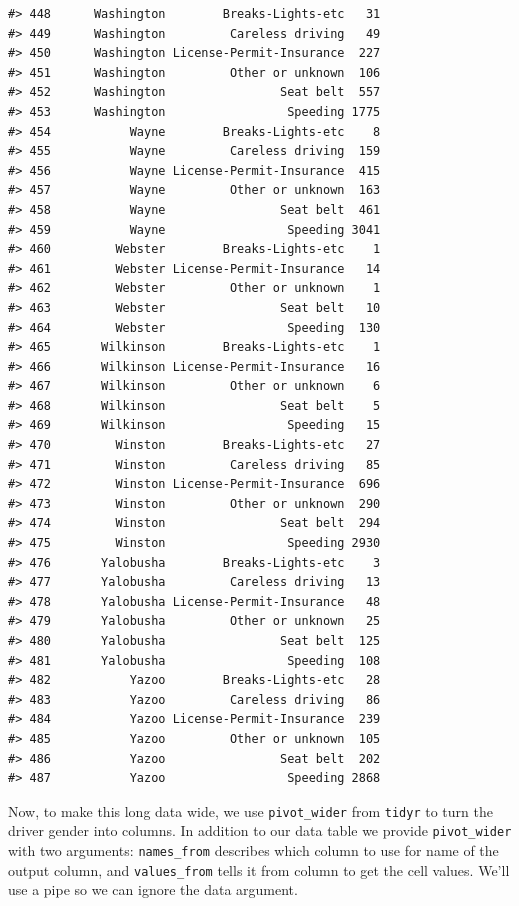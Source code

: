 \documentclass[
]{book}
\begin{document}
\begin{verbatim}
#> 448      Washington        Breaks-Lights-etc   31
#> 449      Washington         Careless driving   49
#> 450      Washington License-Permit-Insurance  227
#> 451      Washington         Other or unknown  106
#> 452      Washington                Seat belt  557
#> 453      Washington                 Speeding 1775
#> 454           Wayne        Breaks-Lights-etc    8
#> 455           Wayne         Careless driving  159
#> 456           Wayne License-Permit-Insurance  415
#> 457           Wayne         Other or unknown  163
#> 458           Wayne                Seat belt  461
#> 459           Wayne                 Speeding 3041
#> 460         Webster        Breaks-Lights-etc    1
#> 461         Webster License-Permit-Insurance   14
#> 462         Webster         Other or unknown    1
#> 463         Webster                Seat belt   10
#> 464         Webster                 Speeding  130
#> 465       Wilkinson        Breaks-Lights-etc    1
#> 466       Wilkinson License-Permit-Insurance   16
#> 467       Wilkinson         Other or unknown    6
#> 468       Wilkinson                Seat belt    5
#> 469       Wilkinson                 Speeding   15
#> 470         Winston        Breaks-Lights-etc   27
#> 471         Winston         Careless driving   85
#> 472         Winston License-Permit-Insurance  696
#> 473         Winston         Other or unknown  290
#> 474         Winston                Seat belt  294
#> 475         Winston                 Speeding 2930
#> 476       Yalobusha        Breaks-Lights-etc    3
#> 477       Yalobusha         Careless driving   13
#> 478       Yalobusha License-Permit-Insurance   48
#> 479       Yalobusha         Other or unknown   25
#> 480       Yalobusha                Seat belt  125
#> 481       Yalobusha                 Speeding  108
#> 482           Yazoo        Breaks-Lights-etc   28
#> 483           Yazoo         Careless driving   86
#> 484           Yazoo License-Permit-Insurance  239
#> 485           Yazoo         Other or unknown  105
#> 486           Yazoo                Seat belt  202
#> 487           Yazoo                 Speeding 2868
\end{verbatim}

Now, to make this long data wide, we use \texttt{pivot\_wider} from \texttt{tidyr} to turn the driver gender into columns. In addition to our data table we provide \texttt{pivot\_wider} with two arguments: \texttt{names\_from} describes which column to use for name of the output column, and \texttt{values\_from} tells it from column to get the cell values. We'll use a pipe so we can ignore the data argument.
\end{document}
